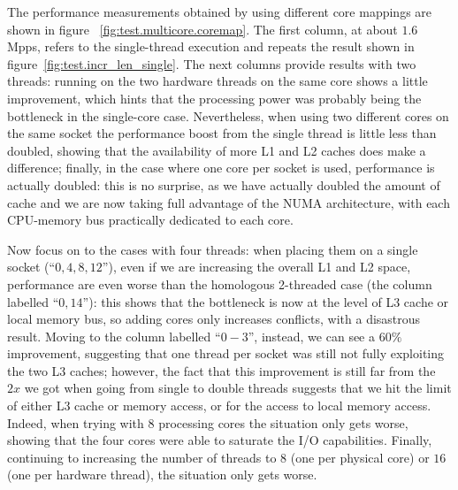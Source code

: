 \documentclass[11pt,a4paper,twoside,titlepage,openany]{book}
\begin{document}
The performance measurements obtained by using different core mappings are shown in figure ~\ref{fig:test.multicore.coremap}. The first column, at about $1.6$ Mpps, refers to the single-thread execution and repeats the result shown in figure~\ref{fig:test.incr_len_single}. The next columns provide results with two threads: running on the two hardware threads on the same core shows a little improvement, which hints that the processing power was probably being the bottleneck in the single-core case. Nevertheless, when using two different cores on the same socket the performance boost from the single thread is little less than doubled, showing that the availability of more L1 and L2 caches does make a difference; finally, in the case where one core per socket is used, performance is actually doubled: this is no surprise, as we have actually doubled the amount of cache and we are now taking full advantage of the NUMA architecture, with each CPU-memory bus practically dedicated to each core.

Now focus on to the cases with four threads: when placing them on a single socket (``$0,4,8,12$''), even if we are increasing the overall L1 and L2 space, performance are even worse than the homologous 2-threaded case (the column labelled ``$0,14$''): this shows that the bottleneck is now at the level of L3 cache or local memory bus, so adding cores only increases conflicts, with a disastrous result. Moving to the column labelled ``$0-3$'', instead, we can see a $60\%$ improvement, suggesting that one thread per socket was still not fully exploiting the two L3 caches; however, the fact that this improvement is still far from the $2x$ we got when going from single to double threads suggests that we hit the limit of either L3 cache or memory access, or for the access to local memory access. Indeed, when trying with 8 processing cores the situation only gets worse, showing that the four cores were able to saturate the I/O capabilities. Finally, continuing to increasing the number of threads to $8$ (one per physical core) or $16$ (one per hardware thread), the situation only gets worse.
\end{document}

